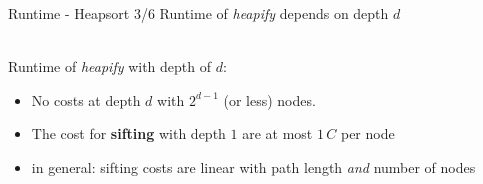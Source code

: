 \documentclass{beamer}
\begin{document}
\begin{frame}{Runtime - Heapsort 3/6}
  Runtime of \textit{heapify} depends on depth $d$
  \begin{tabl}
  \iitem{4em}%
%
%
%
  \end{tabl}\\
  Runtime of \textit{heapify} with depth of $d$:
  \begin{itemize}
    \item<2->
      No costs at depth $d$ with $2^{d - 1}$ (or less) nodes.
    \item<3->
      The cost for \textbf{sifting} with depth $1$ are at most $1 \, C$ per node
    \item<5->  in general: sifting costs are linear with path length
      \emph{and} number of nodes   
  \end{itemize}%
\end{frame}
\end{document}
